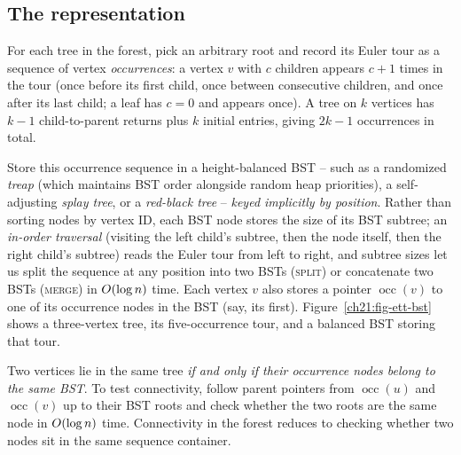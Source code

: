 \subsection{The representation}

For each tree in the forest, pick an arbitrary root and record its Euler tour as a
sequence of vertex \emph{occurrences}: a vertex $v$ with $c$ children appears $c+1$ times in the tour
(once before its first child, once between consecutive children, and once after its last
child; a leaf has $c=0$ and appears once). A tree on $k$ vertices has $k-1$ child-to-parent returns plus $k$ initial entries, giving $2k-1$ occurrences in total.

Store this occurrence sequence in a height-balanced BST -- such as a randomized \emph{treap} (which maintains BST order alongside random heap priorities), a self-adjusting \emph{splay tree}, or a \emph{red-black tree} -- \emph{keyed implicitly by position}. Rather than sorting nodes by vertex ID, each BST node stores the size of its BST subtree; an \emph{in-order traversal} (visiting the left child's subtree, then the node itself, then the right child's subtree) reads the Euler tour from left to right, and subtree sizes let us split the sequence at any position into two BSTs (\textsc{split}) or concatenate two BSTs (\textsc{merge}) in $O(\log n)$ time. Each vertex $v$ also stores a pointer $\operatorname{occ}(v)$ to one of its occurrence nodes in the BST (say, its first). Figure~\ref{ch21:fig-ett-bst} shows a three-vertex tree, its five-occurrence tour, and a balanced BST storing that tour.

\begin{whybox}
Two vertices lie in the same tree \emph{if and only if their occurrence nodes belong to the same
BST}. To test connectivity, follow parent pointers from $\operatorname{occ}(u)$ and $\operatorname{occ}(v)$ up to their BST roots and check whether the two roots are the same node in $O(\log n)$ time. Connectivity in the forest reduces to checking whether two nodes sit in the same sequence container.
\end{whybox}

